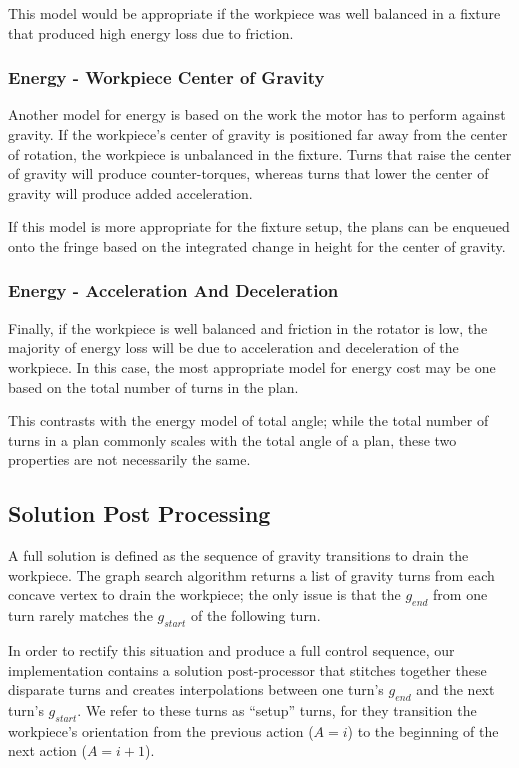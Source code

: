 This model would be appropriate if the workpiece was well balanced in a fixture that produced high energy loss due to friction.

		\subsubsection{Energy - Workpiece Center of Gravity}

Another model for energy is based on the work the motor has to perform against gravity. If the workpiece's center of gravity is positioned far away from the center of rotation, the workpiece is unbalanced in the fixture. Turns that raise the center of gravity will produce counter-torques, whereas turns that lower the center of gravity will produce added acceleration.

If this model is more appropriate for the fixture setup, the plans can be enqueued onto the fringe based on the integrated change in height for the center of gravity.

		\subsubsection{Energy - Acceleration And Deceleration}

Finally, if the workpiece is well balanced and friction in the rotator is low, the majority of energy loss will be due to acceleration and deceleration of the workpiece. In this case, the most appropriate model for energy cost may be one based on the total number of turns in the plan.

This contrasts with the energy model of total angle; while the total number of turns in a plan commonly scales with the total angle of a plan, these two properties are not necessarily the same.

	\subsection{Solution Post Processing}

A full solution is defined as the sequence of gravity transitions to drain the workpiece. The graph search algorithm returns a list of gravity turns from each concave vertex to drain the workpiece; the only issue is that the $g_{end}$ from one turn rarely matches the $g_{start}$ of the following turn.

In order to rectify this situation and produce a full control sequence, our implementation contains a solution post-processor that stitches together these disparate turns and creates interpolations between one turn's $g_{end}$ and the next turn's $g_{start}$. We refer to these turns as ``setup'' turns, for they transition the workpiece's orientation from the previous action ($A=i$) to the beginning of the next action ($A=i + 1$).

